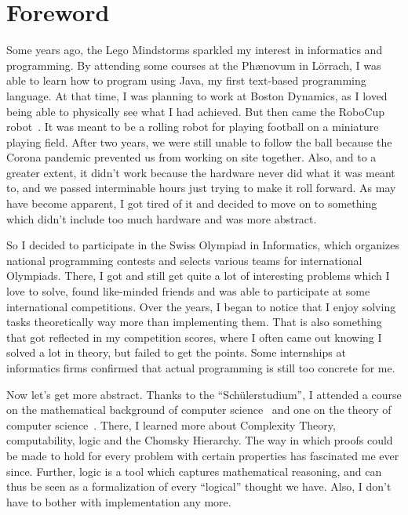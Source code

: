 \chapter*{Foreword}

Some years ago, the Lego Mindstorms sparkled my interest in informatics and programming.
By attending some courses at the Ph\ae novum in Lörrach, I was able to learn how to program using Java, my first text-based programming language.
At that time, I was planning to work at Boston Dynamics, as I loved being able to physically see what I had achieved.
But then came the RoboCup robot~\cite{roboCup}.
It was meant to be a rolling robot for playing football on a miniature playing field.
After two years, we were still unable to follow the ball because the Corona pandemic prevented us from working on site together.
Also, and to a greater extent, it didn't work because the hardware never did what it was meant to, and we passed interminable hours just trying to make it roll forward.
As may have become apparent, I got tired of it and decided to move on to something which didn't include too much hardware and was more abstract.

So I decided to participate in the Swiss Olympiad in Informatics, which organizes national programming contests and selects various teams for international Olympiads.
There, I got and still get quite a lot of interesting problems which I love to solve, found like-minded friends and was able to participate at some international competitions.
Over the years, I began to notice that I enjoy solving tasks theoretically way more than implementing them.
That is also something that got reflected in my competition scores, where I often came out knowing I solved a lot in theory, but failed to get the points.
Some internships at informatics firms confirmed that actual programming is still too concrete for me.

Now let's get more abstract.
Thanks to the ``Schülerstudium'', I attended a course on the mathematical background of computer science~\cite{discrete-maths} and one on the theory of computer science~\cite{theory-cs}.
There, I learned more about Complexity Theory, computability, logic and the Chomsky Hierarchy.
The way in which proofs could be made to hold for every problem with certain properties has fascinated me ever since.
Further, logic is a tool which captures mathematical reasoning, and can thus be seen as a formalization of every ``logical'' thought we have.
Also, I don't have to bother with implementation any more.


